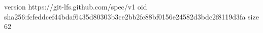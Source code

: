 version https://git-lfs.github.com/spec/v1
oid sha256:fcfeddcef44bdaf6435d80303b3ce2bb2fc88bf0156e24582d3bdc2f8119d3fa
size 62
